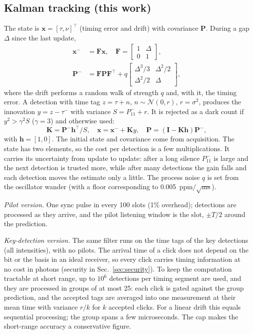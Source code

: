 \documentclass[journal]{IEEEtran}
\theoremstyle{plain}
\begin{document}
\subsection{Kalman tracking (this work)}
The state is $\mathbf x=[\tau,\nu]^\top$ (timing error and drift) with covariance $\mathbf P$. During a gap $\Delta$ since the last update,
\begin{align}
\mathbf x^- &= \mathbf F\mathbf x,\quad \mathbf F=\begin{bmatrix}1&\Delta\\0&1\end{bmatrix},\\
\mathbf P^- &= \mathbf F\mathbf P\mathbf F^\top+q\begin{bmatrix}\Delta^3/3&\Delta^2/2\\ \Delta^2/2&\Delta\end{bmatrix}, \label{eq:predict}
\end{align}
where the drift performs a random walk of strength $q$ and, with it, the timing error. A detection with time tag $z=\tau+n$, $n\sim\mathcal N(0,r)$, $r=\sigma^2$, produces the innovation $y=z-\tau^-$ with variance $S=P^-_{11}+r$. It is rejected as a dark count if $y^2>\gamma^2 S$ ($\gamma=3$) and otherwise used:
\begin{equation}
\mathbf K=\mathbf P^-\mathbf h^\top/S,\quad
\mathbf x=\mathbf x^-+\mathbf K y,\quad
\mathbf P=(\mathbf I-\mathbf K\mathbf h)\mathbf P^-, \label{eq:update}
\end{equation}
with $\mathbf h=[1,0]$. The initial state and covariance come from acquisition. The state has two elements, so the cost per detection is a few multiplications. It carries its uncertainty from update to update: after a long silence $P^-_{11}$ is large and the next detection is trusted more, while after many detections the gain falls and each detection moves the estimate only a little. The process noise $q$ is set from the oscillator wander (with a floor corresponding to 0.005~ppm$/\sqrt{\mathrm{ms}}$).

\emph{Pilot version.} One sync pulse in every 100 slots (1\% overhead); detections are processed as they arrive, and the pilot listening window is the slot, $\pm T/2$ around the prediction.

\emph{Key-detection version.} The same filter runs on the time tags of the key detections (all intensities), with no pilots. The arrival time of a click does not depend on the bit or the basis in an ideal receiver, so every click carries timing information at no cost in photons (security in Sec.~\ref{sec:security}). To keep the computation tractable at short range, up to $10^{6}$ detections per timing segment are used, and they are processed in groups of at most 25: each click is gated against the group prediction, and the accepted tags are averaged into one measurement at their mean time with variance $r/k$ for $k$ accepted clicks. For a linear drift this equals sequential processing; the group spans a few microseconds. The cap makes the short-range accuracy a conservative figure.
\end{document}
